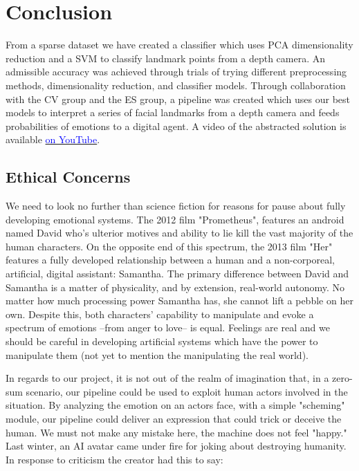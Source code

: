\section{Conclusion}

From a sparse dataset we have created a classifier which uses PCA dimensionality reduction and a SVM to classify landmark points from a depth camera. An admissible accuracy was achieved through trials of trying different preprocessing methods, dimensionality reduction, and classifier models. Through collaboration with the CV group and the ES group, a pipeline was created which uses our best models to interpret a series of facial landmarks from a depth camera and feeds probabilities of emotions to a digital agent. A video of the abstracted solution is available \href{https://youtu.be/Owlukfpjqqk}{\textcolor{blue}{on YouTube}}.

\subsection{Ethical Concerns}
We need to look no further than science fiction for reasons for pause about fully developing emotional systems. The 2012 film "Prometheus", features an android named David who's ulterior motives and ability to lie kill the vast majority of the human characters. On the opposite end of this spectrum, the 2013 film "Her" features a fully developed relationship between a human and a non-corporeal, artificial, digital assistant: Samantha. The primary difference between David and Samantha is a matter of physicality, and by extension, real-world autonomy. No matter how much processing power Samantha has, she cannot lift a pebble on her own. Despite this, both characters' capability to manipulate and evoke a spectrum of emotions --from anger to love-- is equal. Feelings are real and we should be careful in developing artificial systems which have the power to manipulate them (not yet to mention the manipulating the real world).

In regards to our project, it is not out of the realm of imagination that, in a zero-sum scenario, our pipeline could be used to exploit human actors involved in the situation. By analyzing the emotion on an actors face, with a simple "scheming" module, our pipeline could deliver an expression that could trick or deceive the human. We must not make any mistake here, the machine does not feel "happy." Last winter, an AI avatar came under fire for joking about destroying humanity. In response to criticism the creator had this to say:

